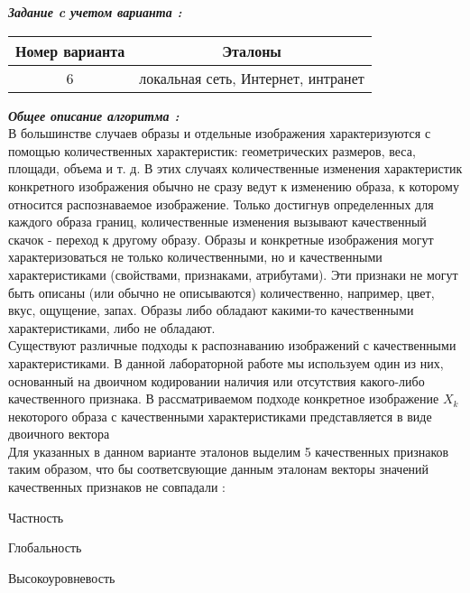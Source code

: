 \documentclass[a4paper,12pt]{article}
\begin{document}
	\begin{flushleft}
		\textit{\textbf{Задание c учетом варианта :}}
		\\
		\begin{center}
				\begin{tabular}{|c|c|}
					\hline \textbf{Номер варианта} & \textbf{Эталоны} \\ 
					\hline 6 & локальная сеть, Интернет, интранет \\ 
					\hline 
				\end{tabular} 	
		\end{center}	
	\end{flushleft}
	\begin{flushleft}
		\textit{\textbf{Общее описание алгоритма :}}
		\\
		\medskip
		\hangindent=1.5cm  \noindent
		В большинстве случаев образы и отдельные изображения характеризуются с помощью количественных характеристик: геометрических размеров, веса, площади, объема и т. д. В этих случаях количественные изменения характеристик конкретного изображения обычно не сразу ведут к изменению образа, к которому относится распознаваемое изображение. Только достигнув определенных для каждого образа границ, количественные изменения вызывают качественный скачок - переход к другому образу. Образы и конкретные изображения могут характеризоваться не только количественными, но и качественными характеристиками (свойствами, признаками, атрибутами). Эти признаки не могут быть описаны (или обычно не описываются) количественно, например, цвет, вкус, ощущение, запах. Образы либо обладают какими-то качественными характеристиками, либо не обладают.
		\\
		\medskip
		Существуют различные подходы к распознаванию изображений с качественными характеристиками. В данной лабораторной работе мы используем один из них, основанный на двоичном кодировании наличия или отсутствия какого-либо качественного признака. В рассматриваемом подходе конкретное изображение ${X_k}$ некоторого образа с качественными характеристиками представляется в виде двоичного вектора
		\\
		\medskip
		Для указанных в данном варианте эталонов выделим 5 качественных признаков таким образом, что бы соответсвующие данным эталонам векторы значений качественных признаков не совпадали :
		\begin{list}{}{\leftmargin=3cm}
				\item Частность
				\item Глобальность
				\item Высокоуровневость 

\end{list}
\end{flushleft}
\end{document}
